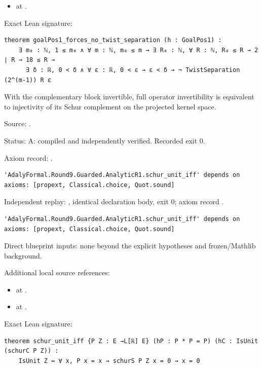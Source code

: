 \begin{theorem}[bp-081]
\begin{itemize}
\item \texttt{} at \texttt{}.
\end{itemize}
\par Exact Lean signature:
\begin{verbatim}
theorem goalPos1_forces_no_twist_separation (h : GoalPos1) :
    ∃ m₀ : ℕ, 1 ≤ m₀ ∧ ∀ m : ℕ, m₀ ≤ m → ∃ R₀ : ℕ, ∀ R : ℕ, R₀ ≤ R → 2 ∣ R → 18 ≤ R →
      ∃ δ : ℝ, 0 < δ ∧ ∀ ε : ℝ, 0 < ε → ε < δ → ¬ TwistSeparation (2^(m-1)) R ε
\end{verbatim}
\end{theorem}

\begin{theorem}[bp-082]
\label{bp-082}
\uses{}
\leanok
With the complementary block invertible, full operator invertibility is equivalent to injectivity of its Schur complement on the projected kernel space.

\par Source: \texttt{}.
\par Status: A: compiled and independently verified. Recorded exit 0.
\par Axiom record: \texttt{}.
\begin{verbatim}
'AdalyFormal.Round9.Guarded.AnalyticR1.schur_unit_iff' depends on axioms: [propext, Classical.choice, Quot.sound]
\end{verbatim}
\par Independent replay: \texttt{}, identical declaration body, exit 0; axiom record \texttt{}.
\begin{verbatim}
'AdalyFormal.Round9.Guarded.AnalyticR1.schur_unit_iff' depends on axioms: [propext, Classical.choice, Quot.sound]
\end{verbatim}
\par Direct blueprint inputs: none beyond the explicit hypotheses and frozen/Mathlib background.
\par Additional local source references:
\begin{itemize}
\item \texttt{} at \texttt{}.
\item \texttt{} at \texttt{}.
\end{itemize}
\par Exact Lean signature:
\begin{verbatim}
theorem schur_unit_iff {P Z : E →L[ℝ] E} (hP : P * P = P) (hC : IsUnit (schurC P Z)) :
    IsUnit Z ↔ ∀ x, P x = x → schurS P Z x = 0 → x = 0
\end{verbatim}
\end{theorem}

